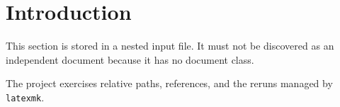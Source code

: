 \section{Introduction}

This section is stored in a nested input file. It must not be discovered as an
independent document because it has no document class.

The project exercises relative paths, references, and the reruns managed by
\texttt{latexmk}.
